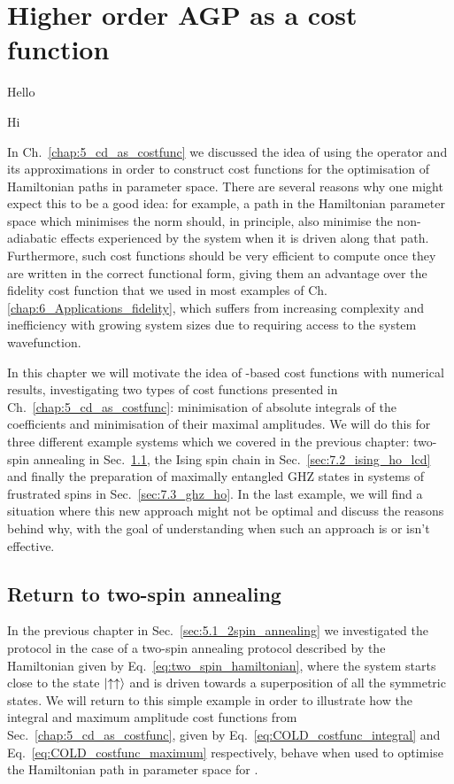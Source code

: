 \chapter{Higher order AGP as a cost function}\label{chap:7_higher_order_agp}

\epigraph{Hello}{Hi}

In Ch.~\ref{chap:5_cd_as_costfunc} we discussed the idea of using the  operator and its approximations in order to construct cost functions for the optimisation of Hamiltonian paths in parameter space. There are several reasons why one might expect this to be a good idea: for example, a path in the Hamiltonian parameter space which minimises the  norm should, in principle, also minimise the non-adiabatic effects experienced by the system when it is driven along that path. Furthermore, such cost functions should be very efficient to compute once they are written in the correct functional form, giving them an advantage over the fidelity cost function that we used in most examples of Ch.\ref{chap:6_Applications_fidelity}, which suffers from increasing complexity and inefficiency with growing system sizes due to requiring access to the system wavefunction.

In this chapter we will motivate the idea of -based cost functions with numerical results, investigating two types of cost functions presented in Ch.~\ref{chap:5_cd_as_costfunc}: minimisation of absolute integrals of the  coefficients and minimisation of their maximal amplitudes. We will do this for three different example systems which we covered in the previous chapter: two-spin annealing in Sec.~\ref{sec:7.1_two_spin_ho}, the Ising spin chain in Sec.~\ref{sec:7.2_ising_ho_lcd} and finally the preparation of maximally entangled GHZ states in systems of frustrated spins in Sec.~\ref{sec:7.3_ghz_ho}. In the last example, we will find a situation where this new approach might not be optimal and discuss the reasons behind why, with the goal of understanding when such an approach is or isn't effective.

\section{Return to two-spin annealing}\label{sec:7.1_two_spin_ho}

In the previous chapter in Sec.~\ref{sec:5.1_2spin_annealing} we investigated the  protocol in the case of a two-spin annealing protocol described by the Hamiltonian given by Eq.~\eqref{eq:two_spin_hamiltonian}, where the system starts close to the state $\ket{\uparrow\uparrow}$ and is driven towards a superposition of all the symmetric states. We will return to this simple example in order to illustrate how the integral and maximum amplitude cost functions from Sec.~\ref{chap:5_cd_as_costfunc}, given by Eq.~\eqref{eq:COLD_costfunc_integral} and Eq.~\eqref{eq:COLD_costfunc_maximum} respectively, behave when used to optimise the Hamiltonian path in parameter space for .

